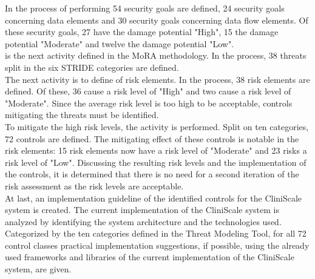 In the process of performing \textit{} 54 security goals are defined, 24 security goals concerning data elements and 30 security goals concerning data flow elements. Of these security goals, 27 have the damage potential "High", 15 the damage potential "Moderate" and twelve the damage potential "Low". \\
\textit{} is the next activity defined in the MoRA methodology. In the process, 38 threats split in the six STRIDE categories are defined.\\
The next activity is \textit{} to define of risk elements. In the process, 38 risk elements are defined. Of these, 36 cause a risk level of "High" and two cause a risk level of "Moderate". Since the average risk level is too high to be acceptable, controls mitigating the threats must be identified.\\
To mitigate the high risk levels, the activity \textit{} is performed. Split on ten categories, 72 controls are defined. The mitigating effect of these controls is notable in the risk elements: 15 risk elements now have a risk level of "Moderate" and 23 risks a risk level of "Low". Discussing the resulting risk levels and the implementation of the controls, it is determined that there is no need for a second iteration of the risk assessment as the risk levels are acceptable.\\
\newline
At last, an implementation guideline of the identified controls for the CliniScale system is created. The current implementation of the CliniScale system is analyzed by identifying the system architecture and the technologies used.\\
Categorized by the ten categories defined in the Threat Modeling Tool, for all 72 control classes practical implementation suggestions, if possible, using the already used frameworks and libraries of the current implementation of the CliniScale system, are given.

